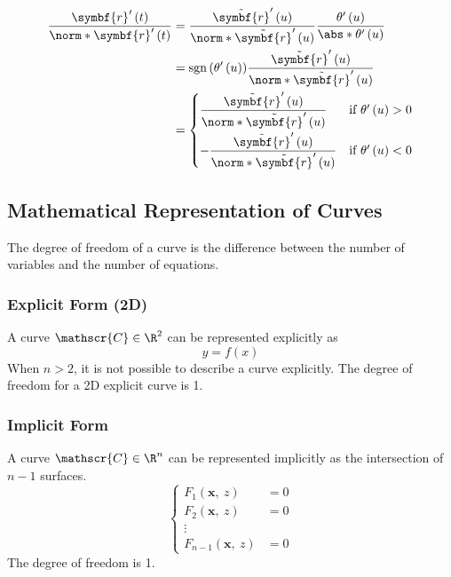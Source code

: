 \documentclass{article}
\DeclareMathOperator{\sign}{sgn}
\begin{document}
\begin{align*}
    \frac{\symbf{r}'\left( t \right)}{\norm*{\symbf{r}'\left( t \right)}} & = \frac{\tilde{\symbf{r}}'\left( u \right)}{\norm*{\tilde{\symbf{r}}'\left( u \right)}} \frac{\theta'\left( u \right)}{\abs*{\theta'\left( u \right)}} \\
                                                                          & = \sign{\left( \theta'\left( u \right) \right)} \frac{\tilde{\symbf{r}}'\left( u \right)}{\norm*{\tilde{\symbf{r}}'\left( u \right)}}                  \\
                                                                          & =
    \begin{cases}
        \displaystyle\frac{\tilde{\symbf{r}}'\left( u \right)}{\norm*{\tilde{\symbf{r}}'\left( u \right)}}  & \text{if } \theta'\left( u \right) > 0 \\[2.5ex]
        -\displaystyle\frac{\tilde{\symbf{r}}'\left( u \right)}{\norm*{\tilde{\symbf{r}}'\left( u \right)}} & \text{if } \theta'\left( u \right) < 0
    \end{cases}
\end{align*}
\subsection{Mathematical Representation of Curves}
\begin{definition}
    The degree of freedom of a curve is the difference between the
    number of variables and the number of equations.
\end{definition}
\subsubsection{Explicit Form (2D)}
A curve \(\mathscr{C} \in \R^2\) can be represented explicitly as
\begin{equation*}
    y = f\left( x \right)
\end{equation*}
When \(n > 2\), it is not possible to describe a curve explicitly.
The degree of freedom for a 2D explicit curve is 1.
\subsubsection{Implicit Form}
A curve \(\mathscr{C} \in \R^n\) can be represented implicitly as the
intersection of \(n - 1\) surfaces.
\begin{equation*}
    \left\{
    \begin{aligned}
        F_1\left( \symbf{x},\: z \right)       & = 0 \\
        F_2\left( \symbf{x},\: z \right)       & = 0 \\
        \vdots                                 &     \\
        F_{n - 1}\left( \symbf{x},\: z \right) & = 0
    \end{aligned}
    \right.
\end{equation*}
The degree of freedom is 1.
\end{document}
